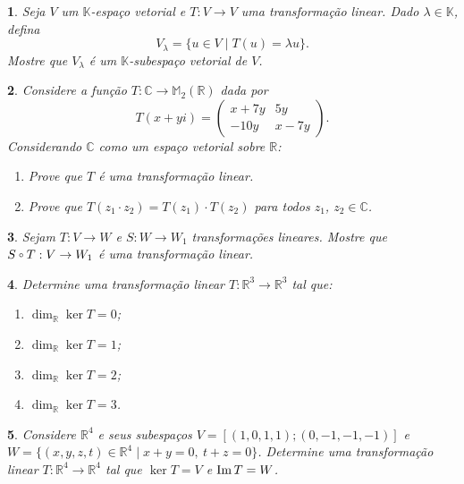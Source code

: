 \documentclass[12pt]{exam}
\newtheorem{exercicio}{}
\newcommand{\im}{{\rm Im\,}}
\newcommand{\real}{\mathbb{R}}
\newcommand{\complex}{\mathbb{C}}
\newcommand{\cp}[1]{\mathbb{#1}}
\newcommand{\compcent}[1]{\vcenter{\hbox{$#1\circ$}}}
\newcommand{\comp}{\mathbin{\mathchoice
{\compcent\scriptstyle}{\compcent\scriptstyle}
{\compcent\scriptscriptstyle}{\compcent\scriptscriptstyle}}}
\begin{document}
\begin{exercicio}
  Seja $V$ um $\cp{K}$-espa\c{c}o vetorial e $T : V \to V$ uma transforma\c{c}\~ao linear. Dado $\lambda \in \cp{K}$, defina
  \[
    V_\lambda = \{ u \in V \mid T(u) = \lambda u\}.
  \]
  Mostre que $V_\lambda$ \'e um $\cp{K}$-subespa\c{c}o vetorial de $V$.
\end{exercicio}

\begin{exercicio}
  Considere a fun\c{c}\~ao $T : \complex \to \cp{M}_2(\real)$ dada por
  \[
    T(x + yi) = \begin{pmatrix}
      x + 7y & 5y\\
      -10y & x - 7y
    \end{pmatrix}.
  \]
  Considerando $\complex$ como um espa\c{c}o vetorial sobre $\real$:
  \begin{enumerate}[label=({\alph*})]
    \item Prove que $T$ \'e uma transforma\c{c}\~ao linear.
    \item Prove que $T(z_1\cdot z_2) = T(z_1)\cdot T(z_2)$ para todos $z_1$, $z_2 \in \complex$.
  \end{enumerate}
\end{exercicio}

\begin{exercicio}
  Sejam $T : V \to W$ e $S : W \to W_1$ transforma\c{c}\~oes lineares. Mostre que $S \comp T : V \to W_1$ \'e uma transforma\c{c}\~ao linear.
\end{exercicio}

\begin{exercicio}
  Determine uma transforma\c{c}\~ao linear $T : \real^3 \to \real^3$ tal que:
  \begin{enumerate}[label=({\alph*})]
    \item $\dim_\real \ker T = 0$;
    \item $\dim_\real \ker T = 1$;
    \item $\dim_\real \ker T = 2$;
    \item $\dim_\real \ker T = 3$.
  \end{enumerate}
\end{exercicio}

\begin{exercicio}
  Considere $\real^4$ e seus subespa\c{c}os $V = [(1,0,1,1);(0,-1,-1,-1)]$ e $W = \{(x,y,z,t) \in \real^4 \mid x + y = 0,\ t + z = 0\}$. Determine uma transforma\c{c}\~ao linear $T : \real^4 \to \real^4$ tal que $\ker T = V$ e $\im T = W$.
\end{exercicio}
\end{document}
